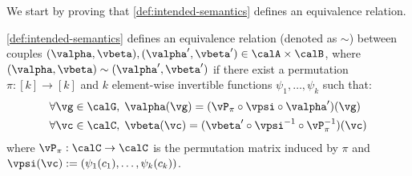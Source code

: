 We start by proving that \cref{def:intended-semantics} defines an equivalence relation. 

\begin{proposition}
    \cref{def:intended-semantics} defines an equivalence relation (denoted as $\sim$) between couples $(\valpha, \vbeta), (\valpha', \vbeta') \in \calA \times \calB$, where $(\valpha, \vbeta) \sim (\valpha', \vbeta')$ if there exist a permutation $\pi:[k] \to [k]$ and $k$ element-wise invertible functions $\psi_1, \ldots, \psi_k$ such that:
    \begin{align}
        &\forall \vg \in \calG, \; \valpha (\vg) = (\vP_\pi \circ \vpsi \circ \valpha') (\vg) \\
        &\forall \vc \in \calC, \; \vbeta (\vc) = ( \vbeta' \circ \vpsi^{-1} \circ \vP^{-1}_\pi  ) (\vc)
    \end{align}
    where $\vP_\pi: \calC \to \calC$ is the permutation matrix induced by $\pi$ and $\vpsi(\vc) := (\psi_1(c_1), \ldots, \psi_k(c_k))$.
\end{proposition}

